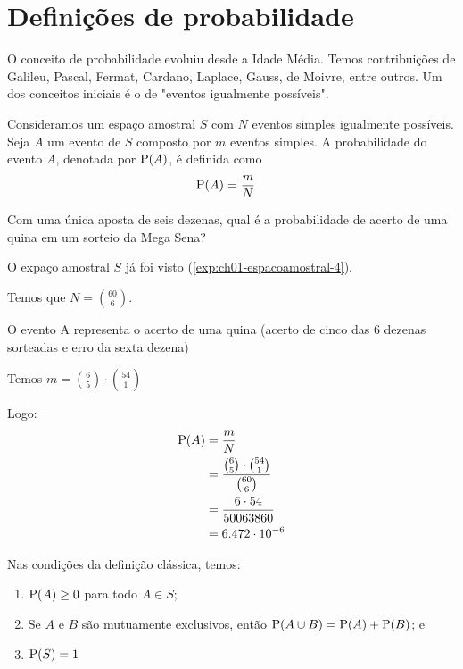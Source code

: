 \section{Definições de probabilidade}

O conceito de probabilidade evoluiu desde a Idade Média.
Temos contribuições de Galileu, Pascal, Fermat, Cardano, Laplace,
Gauss, de Moivre, entre outros. Um dos conceitos iniciais é o
de "eventos igualmente possíveis".

\begin{definition}
    Consideramos um espaço amostral $S$ com $N$ eventos simples
    igualmente possíveis. Seja $A$ um evento de $S$ composto por
    $m$ eventos simples. A probabilidade do evento $A$, denotada por
    $\operatorname{P}(A)$, é definida como
    \begin{align}\label{eq:ch01-def-classica}
        \operatorname{P}(A) &= \frac{m}{N}
    \end{align}
\end{definition}

\begin{example}
    Com uma única aposta de seis dezenas, qual é a probabilidade
    de acerto de uma quina em um sorteio da Mega Sena?
    
    \bigskip
    O expaço amostral $S$ já foi visto (\cref{exp:ch01-espacoamostral-4}).
    
    Temos que $N = \binom{60}{6}$.
    
    \medskip
    O evento A representa o acerto de uma quina (acerto de cinco
    das 6 dezenas sorteadas e erro da sexta dezena)

    Temos $m = \binom{6}{5} \cdot \binom{54}{1}$

    Logo:
    \begin{align*}
        \operatorname{P}(A)
            &= \frac{m}{N} \\
            &= \frac{\binom{6}{5} \cdot \binom{54}{1}}{\binom{60}{6}} \\
            &= \frac{6 \cdot 54}
                {50063860} \\
            &= 6.472 \cdot 10^{-6}
    \end{align*}
\end{example}

\begin{lemma}
    Nas condições da definição clássica, temos:
    \begin{enumerate}
        \item $\operatorname{P}(A) \geq 0$ para todo $A \in S$;
        \item Se $A$ e $B$ são mutuamente exclusivos, então
            $\operatorname{P}(A \cup B) = \operatorname{P}(A) + \operatorname{P}(B)$; e
        \item $\operatorname{P}(S) = 1$
    \end{enumerate}
\end{lemma}

